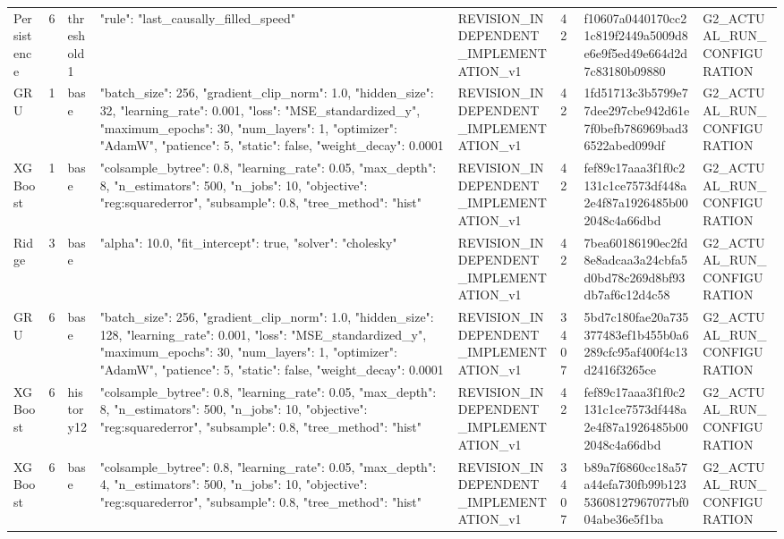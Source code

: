 \begin{longtable}{llllllll}
Persistence & 6 & threshold1 & {"rule": "last\_causally\_filled\_speed"} & REVISION\_INDEPENDENT\_IMPLEMENTATION\_v1 & 42 & f10607a0440170cc21c819f2449a5009d8e6e9f5ed49e664d2d7c83180b09880 & G2\_ACTUAL\_RUN\_CONFIGURATION \\
GRU & 1 & base & {"batch\_size": 256, "gradient\_clip\_norm": 1.0, "hidden\_size": 32, "learning\_rate": 0.001, "loss": "MSE\_standardized\_y", "maximum\_epochs": 30, "num\_layers": 1, "optimizer": "AdamW", "patience": 5, "static": false, "weight\_decay": 0.0001} & REVISION\_INDEPENDENT\_IMPLEMENTATION\_v1 & 42 & 1fd51713c3b5799e77dee297cbe942d61e7f0befb786969bad36522abed099df & G2\_ACTUAL\_RUN\_CONFIGURATION \\
XGBoost & 1 & base & {"colsample\_bytree": 0.8, "learning\_rate": 0.05, "max\_depth": 8, "n\_estimators": 500, "n\_jobs": 10, "objective": "reg:squarederror", "subsample": 0.8, "tree\_method": "hist"} & REVISION\_INDEPENDENT\_IMPLEMENTATION\_v1 & 42 & fef89c17aaa3f1f0c2131c1ce7573df448a2e4f87a1926485b002048c4a66dbd & G2\_ACTUAL\_RUN\_CONFIGURATION \\
Ridge & 3 & base & {"alpha": 10.0, "fit\_intercept": true, "solver": "cholesky"} & REVISION\_INDEPENDENT\_IMPLEMENTATION\_v1 & 42 & 7bea60186190ec2fd8e8adcaa3a24cbfa5d0bd78c269d8bf93db7af6c12d4c58 & G2\_ACTUAL\_RUN\_CONFIGURATION \\
GRU & 6 & base & {"batch\_size": 256, "gradient\_clip\_norm": 1.0, "hidden\_size": 128, "learning\_rate": 0.001, "loss": "MSE\_standardized\_y", "maximum\_epochs": 30, "num\_layers": 1, "optimizer": "AdamW", "patience": 5, "static": false, "weight\_decay": 0.0001} & REVISION\_INDEPENDENT\_IMPLEMENTATION\_v1 & 3407 & 5bd7c180fae20a735377483ef1b455b0a6289cfc95af400f4c13d2416f3265ce & G2\_ACTUAL\_RUN\_CONFIGURATION \\
XGBoost & 6 & history12 & {"colsample\_bytree": 0.8, "learning\_rate": 0.05, "max\_depth": 8, "n\_estimators": 500, "n\_jobs": 10, "objective": "reg:squarederror", "subsample": 0.8, "tree\_method": "hist"} & REVISION\_INDEPENDENT\_IMPLEMENTATION\_v1 & 42 & fef89c17aaa3f1f0c2131c1ce7573df448a2e4f87a1926485b002048c4a66dbd & G2\_ACTUAL\_RUN\_CONFIGURATION \\
XGBoost & 6 & base & {"colsample\_bytree": 0.8, "learning\_rate": 0.05, "max\_depth": 4, "n\_estimators": 500, "n\_jobs": 10, "objective": "reg:squarederror", "subsample": 0.8, "tree\_method": "hist"} & REVISION\_INDEPENDENT\_IMPLEMENTATION\_v1 & 3407 & b89a7f6860cc18a57a44efa730fb99b12353608127967077bf004abe36e5f1ba & G2\_ACTUAL\_RUN\_CONFIGURATION \\

\end{longtable}
